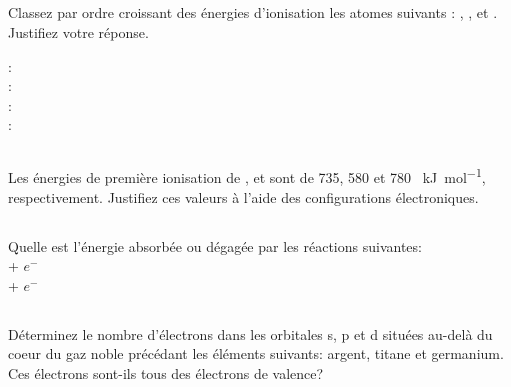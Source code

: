 \subsection{}
Classez par ordre croissant des énergies d'ionisation les atomes suivants : , , et . Justifiez votre réponse.
\begin{solution}
	:\\
	:\\
	:\\
	:\\
\end{solution}

\subsection{}
Les énergies de première ionisation de ,  et  sont de 735, 580 et 780 \SI{}{\kilo\joule\per\mole}, respectivement. Justifiez ces valeurs à l'aide des configurations électroniques.
\begin{solution}
	
\end{solution}

\subsection{}
Quelle est l'énergie absorbée ou dégagée par les réactions suivantes:\\
 + $e^-$ \ce{->} \\
 + $e^-$ \ce{->} 
\begin{solution}
	
\end{solution}

\subsection{}
Déterminez le nombre d'électrons dans les orbitales s, p et d situées au-delà du coeur du gaz noble précédant les éléments suivants: argent, titane et germanium. Ces électrons sont-ils tous des électrons de valence?
\begin{solution}
	
\end{solution}
\subsection{}